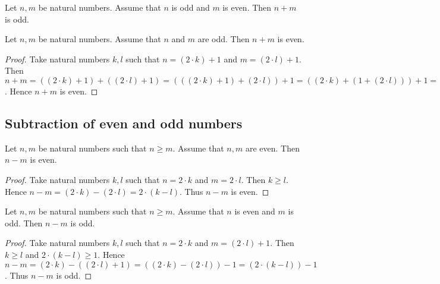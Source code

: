 \documentclass[10pt]{article}
\begin{document}
  \begin{forthel}
    \begin{corollary}
      Let $n, m$ be natural numbers.
      Assume that $n$ is odd and $m$ is even.
      Then $n + m$ is odd.
    \end{corollary}
  \end{forthel}

  \begin{forthel}
    \begin{proposition}
      Let $n, m$ be natural numbers.
      Assume that $n$ and $m$ are odd.
      Then $n + m$ is even.
    \end{proposition}
    \begin{proof}
      Take natural numbers $k, l$ such that $n = (2 \cdot k) + 1$ and $m = (2 \cdot l) + 1$.
      Then $n + m =
      ((2 \cdot k) + 1) + ((2 \cdot l) + 1) =
      (((2 \cdot k) + 1) + (2 \cdot l)) + 1 =
      ((2 \cdot k) + (1 + (2 \cdot l))) + 1 =
      ((2 \cdot k) + ((2 \cdot l) + 1)) + 1 =
      (((2 \cdot k) + (2 \cdot l)) + 1) + 1 =
      ((2 \cdot k) + (2 \cdot l)) + (1 + 1) =
      ((2 \cdot k) + (2 \cdot l)) + 2 =
      (2 \cdot (k + l)) + 2 =
      2 \cdot ((k + l) + 1)$.
      Hence $n + m$ is even.
    \end{proof}
  \end{forthel}


  \subsection{Subtraction of even and odd numbers}

  \begin{forthel}
    \begin{proposition}
      Let $n, m$ be natural numbers such that $n \geq m$.
      Assume that $n, m$ are even.
      Then $n - m$ is even.
    \end{proposition}
    \begin{proof}
      Take natural numbers $k, l$ such that $n = 2 \cdot k$ and $m = 2 \cdot l$.
      Then $k \geq l$.
      Hence $n - m =
      (2 \cdot k) - (2 \cdot l) =
      2 \cdot (k - l)$.
      Thus $n - m$ is even.
    \end{proof}
  \end{forthel}

  \begin{forthel}
    \begin{proposition}
      Let $n, m$ be natural numbers such that $n \geq m$.
      Assume that $n$ is even and $m$ is odd.
      Then $n - m$ is odd.
    \end{proposition}
    \begin{proof}
      Take natural numbers $k, l$ such that $n = 2 \cdot k$ and $m = (2 \cdot l) + 1$.
      Then $k \geq l$ and $2 \cdot (k - l) \geq 1$.
      Hence $n - m =
      (2 \cdot k) - ((2 \cdot l) + 1) =
      ((2 \cdot k) - (2 \cdot l)) - 1 =
      (2 \cdot (k - l)) - 1$.
      Thus $n - m$ is odd.
    \end{proof}
  \end{forthel}
\end{document}
